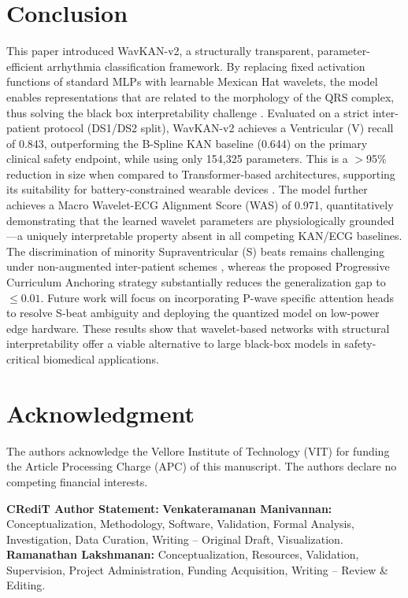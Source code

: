 \documentclass[journal,twoside,web]{ieeecolor}
\begin{document}
\section{Conclusion}
\label{sec:conclusion}
This paper introduced WavKAN-v2, a structurally transparent, parameter-efficient arrhythmia classification framework. By replacing fixed activation functions of standard MLPs with learnable Mexican Hat wavelets, the model enables representations that are related to the morphology of the QRS complex, thus solving the black box interpretability challenge \cite{taleban_explainable_2026}. Evaluated on a strict inter-patient protocol (DS1/DS2 split), WavKAN-v2 achieves a Ventricular (V) recall of 0.843, outperforming the B-Spline KAN baseline (0.644) on the primary clinical safety endpoint, while using only 154,325 parameters. This is a $>$95\% reduction in size when compared to Transformer-based architectures, supporting its suitability for battery-constrained wearable devices \cite{farag_tiny_2023}. The model further achieves a Macro Wavelet-ECG Alignment Score (WAS) of 0.971, quantitatively demonstrating that the learned wavelet parameters are physiologically grounded---a uniquely interpretable property absent in all competing KAN/ECG baselines. The discrimination of minority Supraventricular (S) beats remains challenging under non-augmented inter-patient schemes \cite{bahrami_investigation_2025}, whereas the proposed Progressive Curriculum Anchoring strategy substantially reduces the generalization gap to $\le 0.01$. Future work will focus on incorporating P-wave specific attention heads to resolve S-beat ambiguity and deploying the quantized model on low-power edge hardware. These results show that wavelet-based networks with structural interpretability offer a viable alternative to large black-box models in safety-critical biomedical applications.


\section*{Acknowledgment}
The authors acknowledge the Vellore Institute of Technology (VIT) for funding the Article Processing Charge (APC) of this manuscript. The authors declare no competing financial interests.

\textbf{CRediT Author Statement:}
\textbf{Venkateramanan Manivannan:} Conceptualization, Methodology, Software, Validation, Formal Analysis, Investigation, Data Curation, Writing -- Original Draft, Visualization.
\textbf{Ramanathan Lakshmanan:} Conceptualization, Resources, Validation, Supervision, Project Administration, Funding Acquisition, Writing -- Review \& Editing.
\end{document}

